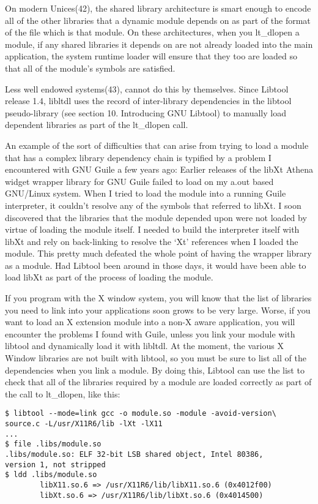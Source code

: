 On modern Unices(42), the shared library architecture is smart enough to encode all of the other libraries that a dynamic module depends on as part of the format of the file which is that module. On these architectures, when you lt\_{}dlopen a module, if any shared libraries it depends on are not already loaded into the main application, the system runtime loader will ensure that they too are loaded so that all of the module's symbols are satisfied.

Less well endowed systems(43), cannot do this by themselves. Since Libtool release 1.4, libltdl uses the record of inter-library dependencies in the libtool pseudo-library (see section 10. Introducing GNU Libtool) to manually load dependent libraries as part of the lt\_{}dlopen call.

An example of the sort of difficulties that can arise from trying to load a module that has a complex library dependency chain is typified by a problem I encountered with GNU Guile a few years ago: Earlier releases of the libXt Athena widget wrapper library for GNU Guile failed to load on my a.out based GNU/Linux system. When I tried to load the module into a running Guile interpreter, it couldn't resolve any of the symbols that referred to libXt. I soon discovered that the libraries that the module depended upon were not loaded by virtue of loading the module itself. I needed to build the interpreter itself with libXt and rely on back-linking to resolve the `Xt' references when I loaded the module. This pretty much defeated the whole point of having the wrapper library as a module. Had Libtool been around in those days, it would have been able to load libXt as part of the process of loading the module.

If you program with the X window system, you will know that the list of libraries you need to link into your applications soon grows to be very large. Worse, if you want to load an X extension module into a non-X aware application, you will encounter the problems I found with Guile, unless you link your module with libtool and dynamically load it with libltdl. At the moment, the various X Window libraries are not built with libtool, so you must be sure to list all of the dependencies when you link a module. By doing this, Libtool can use the list to check that all of the libraries required by a module are loaded correctly as part of the call to lt\_{}dlopen, like this: 


\begin{Verbatim}[frame=single]
$ libtool --mode=link gcc -o module.so -module -avoid-version\
source.c -L/usr/X11R6/lib -lXt -lX11
...
$ file .libs/module.so
.libs/module.so: ELF 32-bit LSB shared object, Intel 80386,
version 1, not stripped
$ ldd .libs/module.so
        libX11.so.6 => /usr/X11R6/lib/libX11.so.6 (0x4012f00)
        libXt.so.6 => /usr/X11R6/lib/libXt.so.6 (0x4014500)
\end{Verbatim}

